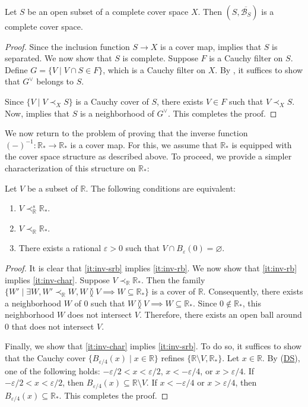 \documentclass[pdflatex,sn-mathphys-num]{sn-jnl}
\newcommand{\axref}[1]{(\hyperref[ax:#1]{#1})}
\theoremstyle{definition}
\theoremstyle{remark}
\numberwithin{figure}{section}
\newcommand{\overlap}[2]{#1 \between #2}
\newcommand{\rb}{\prec}
\begin{document}
\begin{prop}
Let $S$ be an open subset of a complete cover space $X$.
Then $(S,\overline{\mathcal{B}_S})$ is a complete cover space.
\end{prop}
\begin{proof}
Since the inclusion function $S \to X$ is a cover map,  implies that $S$ is separated.
We now show that $S$ is complete.
Suppose $F$ is a Cauchy filter on $S$.
Define $G = \{ V \mid V \cap S \in F \}$, which is a Cauchy filter on $X$.
By , it suffices to show that $G^\vee$ belongs to $S$.

Since $\{ V \mid V \rb_X S \}$ is a Cauchy cover of $S$, there exists $V \in F$ such that $V \rb_X S$.
Now,  implies that $S$ is a neighborhood of $G^\vee$.
This completes the proof.
\end{proof}

We now return to the problem of proving that the inverse function $(-)^{-1} : \mathbb{R}_* \to \mathbb{R}_*$ is a cover map.
For this, we assume that $\mathbb{R}_*$ is equipped with the cover space structure as described above.
To proceed, we provide a simpler characterization of this structure on $\mathbb{R}_*$:

\begin{lem}
Let $V$ be a subset of $\mathbb{R}$.
The following conditions are equivalent:
\begin{enumerate}
\item \label{it:inv-srb} $V \rb^s_\mathbb{R} \mathbb{R}_*$.
\item \label{it:inv-rb} $V \rb_\mathbb{R} \mathbb{R}_*$.
\item \label{it:inv-char} There exists a rational $\varepsilon > 0$ such that $V \cap B_\varepsilon(0) = \varnothing$.
\end{enumerate}
\end{lem}
\begin{proof}
It is clear that \eqref{it:inv-srb} implies \eqref{it:inv-rb}.
We now show that \eqref{it:inv-rb} implies \eqref{it:inv-char}. 
Suppose $V \rb_\mathbb{R} \mathbb{R}_*$.
Then the family $\{ W' \mid \exists W, W' \rb_\mathbb{R} W, \overlap{W}{V} \implies W \subseteq \mathbb{R}_* \}$ is a cover of $\mathbb{R}$.
Consequently, there exists a neighborhood $W$ of $0$ such that $\overlap{W}{V} \implies W \subseteq \mathbb{R}_*$.
Since $0 \notin \mathbb{R}_*$, this neighborhood $W$ does not intersect $V$.
Therefore, there exists an open ball around $0$ that does not intersect $V$.

Finally, we show that \eqref{it:inv-char} implies \eqref{it:inv-srb}.
To do so, it suffices to show that the Cauchy cover $\{ B_{\varepsilon/4}(x) \mid x \in \mathbb{R} \}$ refines $\{ \mathbb{R} \setminus V, \mathbb{R}_* \}$.
Let $x \in \mathbb{R}$.
By \axref{DS}, one of the following holds: $-\varepsilon/2 < x < \varepsilon/2$, $x < -\varepsilon/4$, or $x > \varepsilon/4$.
If $-\varepsilon/2 < x < \varepsilon/2$, then $B_{\varepsilon/4}(x) \subseteq \mathbb{R} \setminus V$.
If $x < -\varepsilon/4$ or $x > \varepsilon/4$, then $B_{\varepsilon/4}(x) \subseteq \mathbb{R}_*$.
This completes the proof.
\end{proof}
\end{document}
